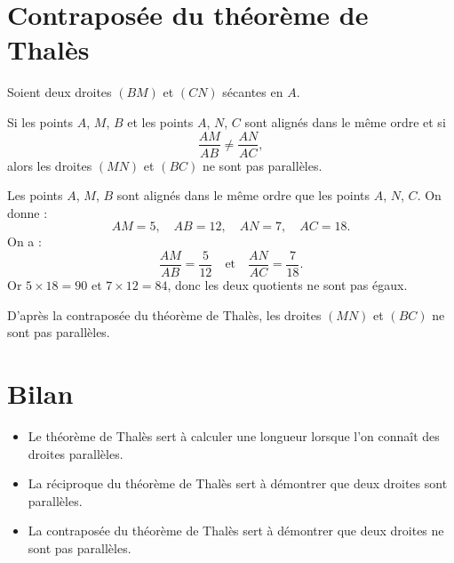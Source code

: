 \documentclass[a4paper,10pt]{report}
\begin{document}
\section{Contraposée du théorème de Thalès}

\begin{thm}
Soient deux droites $(BM)$ et $(CN)$ sécantes en $A$.

Si les points $A$, $M$, $B$ et les points $A$, $N$, $C$ sont alignés dans le même ordre et si
\[
\dfrac{AM}{AB}\neq\dfrac{AN}{AC},
\]
alors les droites $(MN)$ et $(BC)$ ne sont pas parallèles.
\end{thm}

\begin{ex}
Les points $A$, $M$, $B$ sont alignés dans le même ordre que les points $A$, $N$, $C$.
On donne :
\[
AM=5,\quad AB=12,\quad AN=7,\quad AC=18.
\]
On a :
\[
\dfrac{AM}{AB}=\dfrac{5}{12}
\quad \text{et} \quad
\dfrac{AN}{AC}=\dfrac{7}{18}.
\]
Or $5\times 18=90$ et $7\times 12=84$, donc les deux quotients ne sont pas égaux.

D'après la contraposée du théorème de Thalès, les droites $(MN)$ et $(BC)$ ne sont pas parallèles.
\end{ex}

\section{Bilan}

\begin{memento}
\begin{itemize}
\item Le théorème de Thalès sert à calculer une longueur lorsque l'on connaît des droites parallèles.
\item La réciproque du théorème de Thalès sert à démontrer que deux droites sont parallèles.
\item La contraposée du théorème de Thalès sert à démontrer que deux droites ne sont pas parallèles.
\end{itemize}
\end{memento}
\end{document}
